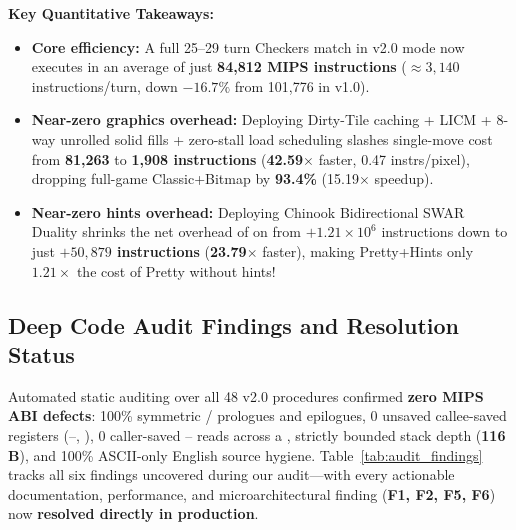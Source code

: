 \textbf{Key Quantitative Takeaways:}
\begin{itemize}
    \item \textbf{Core efficiency:} A full 25--29 turn Checkers match in v2.0  mode now executes in an average of just \textbf{84,812 MIPS instructions} ($\approx 3{,}140$ instructions/turn, down $-16.7\%$ from 101,776 in v1.0).
    \item \textbf{Near-zero graphics overhead:} Deploying Dirty-Tile caching + LICM + 8-way unrolled solid fills + zero-stall load scheduling slashes single-move  cost from \textbf{81,263} to \textbf{1,908 instructions} (\textbf{42.59$\times$} faster, 0.47 instrs/pixel), dropping full-game Classic+Bitmap by \textbf{93.4\%} (15.19$\times$ speedup).
    \item \textbf{Near-zero hints overhead:} Deploying Chinook Bidirectional SWAR Duality shrinks the net overhead of  on  from $+1.21\times 10^6$ instructions down to just \textbf{$+50{,}879$ instructions} (\textbf{23.79$\times$} faster), making Pretty+Hints only $1.21\times$ the cost of Pretty without hints!
\end{itemize}

\subsection{Deep Code Audit Findings and Resolution Status}
\label{sec:audit_findings}
Automated static auditing over all 48 v2.0 procedures confirmed \textbf{zero MIPS ABI defects}: 100\% symmetric / prologues and epilogues, 0 unsaved callee-saved registers (--, ), 0 caller-saved -- reads across a , strictly bounded stack depth (\textbf{116\,B}), and 100\% ASCII-only English source hygiene. Table~\ref{tab:audit_findings} tracks all six findings uncovered during our audit---with every actionable documentation, performance, and microarchitectural finding (\textbf{F1, F2, F5, F6}) now \textbf{resolved directly in production}.


